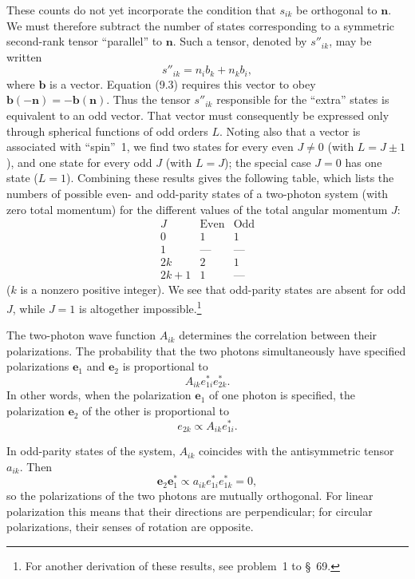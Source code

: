 These counts do not yet incorporate the condition that $s_{ik}$ be orthogonal to $\mathbf{n}$. We must therefore subtract the number of states corresponding to a symmetric second-rank tensor ``parallel'' to $\mathbf{n}$. Such a tensor, denoted by $s''_{ik}$, may be written
\[
s''_{ik}=n_i b_k+n_k b_i,
\]
where $\mathbf{b}$ is a vector. Equation (9.3) requires this vector to obey $\mathbf{b}(-\mathbf{n})=-\mathbf{b}(\mathbf{n})$. Thus the tensor $s''_{ik}$ responsible for the ``extra'' states is equivalent to an odd vector. That vector must consequently be expressed only through spherical functions of odd orders $L$. Noting also that a vector is associated with ``spin''~1, we find two states for every even $J\ne0$ (with $L=J\pm1$), and one state for every odd $J$ (with $L=J$); the special case $J=0$ has one state ($L=1$). Combining these results gives the following table, which lists the numbers of possible even- and odd-parity states of a two-photon system (with zero total momentum) for the different values of the total angular momentum $J$:
\begin{equation}
\begin{array}{c|c|c}
J & \text{Even} & \text{Odd}\\ \hline
0 & 1 & 1\\
1 & \text{---} & \text{---}\\
2k & 2 & 1\\
2k+1 & 1 & \text{---}
\end{array}
\tag{9.5}
\end{equation}
($k$ is a nonzero positive integer). We see that odd-parity states are absent for odd $J$, while $J=1$ is altogether impossible.\footnote{For another derivation of these results, see problem~1 to \S~69.}

The two-photon wave function $A_{ik}$ determines the correlation between their polarizations. The probability that the two photons simultaneously have specified polarizations $\mathbf{e}_1$ and $\mathbf{e}_2$ is proportional to
\[
A_{ik}e^*_{1i}e^*_{2k}.
\]
In other words, when the polarization $\mathbf{e}_1$ of one photon is specified, the polarization $\mathbf{e}_2$ of the other is proportional to
\begin{equation}
e_{2k}\propto A_{ik}e^*_{1i}.
\tag{9.6}
\end{equation}

In odd-parity states of the system, $A_{ik}$ coincides with the antisymmetric tensor $a_{ik}$. Then
\[
\mathbf{e}_2\mathbf{e}_1^*\propto a_{ik}e^*_{1i}e^*_{1k}=0,
\]
so the polarizations of the two photons are mutually orthogonal. For linear polarization this means that their directions are perpendicular; for circular polarizations, their senses of rotation are opposite.

